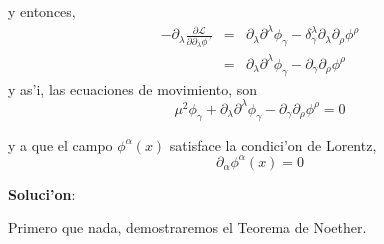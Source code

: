y entonces,
\begin{eqnarray*}
-\partial _{\lambda }\frac{\partial \mathcal{L}}{\partial \partial _{\lambda
}\phi ^{\gamma }} &=&\partial _{\lambda }\partial ^{\lambda }\phi _{\gamma
}-\delta _{\gamma }^{\lambda }\partial _{\lambda }\partial _{\rho }\phi
^{\rho } \\
&=&\partial _{\lambda }\partial ^{\lambda }\phi _{\gamma }-\partial _{\gamma
}\partial _{\rho }\phi ^{\rho }
\end{eqnarray*}
y as'i, las ecuaciones de movimiento, son
\begin{equation}
\mu ^{2}\phi _{\gamma }+\partial _{\lambda }\partial ^{\lambda }\phi
_{\gamma }-\partial _{\gamma }\partial _{\rho }\phi ^{\rho }=0
\end{equation}

 y a que el campo $\phi ^{\alpha }(x) $ satisface la
condici'on de Lorentz,
\begin{equation}
\partial _{\alpha }\phi ^{\alpha }(x) =0
\end{equation}

\textbf{Soluci'on}:

Primero que nada, demostraremos el Teorema de Noether.

